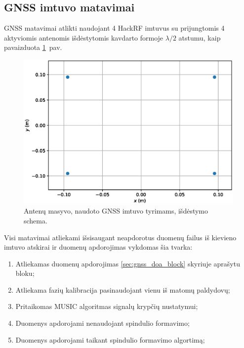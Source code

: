 \documentclass[main.tex]{subfiles}
\begin{document}
\subsection{GNSS imtuvo matavimai}

GNSS matavimai atlikti naudojant 4 HackRF imtuvus su prijungtomis
4 aktyviomis antenomis išdėstytomis kavdarto formoje $\lambda / 2$
atstumu, kaip pavaizduota \ref{fig:gnss_antenna_patern}~pav.

\begin{figure}[h]
    \begin{centering}
    \includegraphics[scale=0.65]{drawings/antenna_pattern}
    \par\end{centering}
    \protect\caption{\label{fig:gnss_antenna_patern}Antenų masyvo, naudoto GNSS imtuvo tyrimams, išdėstymo schema.}
\end{figure}

Visi matavimai atliekami išsisaugant neapdorotus duomenų failus iš kievieno
imtuvo atskirai ir duomenų apdorojimas vykdomas šia tvarka:

\begin{enumerate}
    \item Atliekamas duomenų apdorojimas \ref{sec:gnss_doa_block} skyriuje aprašytu bloku;
    \item Atliekama fazių kalibracija pasinaudojant vienu iš matomų paldydovų;
    \item Pritaikomas MUSIC algoritmas signalų krypčių nustatymui;
    \item Duomenys apdorojami nenaudojant spindulio formavimo;
    \item Duomenys apdorojami taikant spindulio formavimo algortimą;
\end{enumerate}
\end{document}
